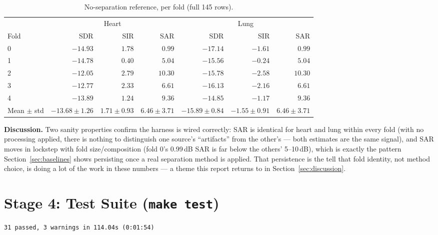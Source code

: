 \documentclass[11pt]{article}
\begin{document}
\begin{table}[H]
\centering
\caption{No-separation reference, per fold (full 145 rows).}
\small
\begin{tabular}{@{}lrrrrrr@{}}
\toprule
& \multicolumn{3}{c}{Heart} & \multicolumn{3}{c}{Lung} \\
Fold & SDR & SIR & SAR & SDR & SIR & SAR \\
\midrule
0 & $-14.93$ & $1.78$ & $0.99$  & $-17.14$ & $-1.61$ & $0.99$ \\
1 & $-14.78$ & $0.40$ & $5.04$  & $-15.56$ & $-0.24$ & $5.04$ \\
2 & $-12.05$ & $2.79$ & $10.30$ & $-15.78$ & $-2.58$ & $10.30$ \\
3 & $-12.77$ & $2.33$ & $6.61$  & $-16.13$ & $-2.16$ & $6.61$ \\
4 & $-13.89$ & $1.24$ & $9.36$  & $-14.85$ & $-1.17$ & $9.36$ \\
\midrule
Mean $\pm$ std & $-13.68\pm1.26$ & $1.71\pm0.93$ & $6.46\pm3.71$ & $-15.89\pm0.84$ & $-1.55\pm0.91$ & $6.46\pm3.71$ \\
\bottomrule
\end{tabular}
\end{table}

\textbf{Discussion.} Two sanity properties confirm the harness is wired
correctly: SAR is identical for heart and lung within every fold (with no
processing applied, there is nothing to distinguish one source's
``artifacts'' from the other's --- both estimates are the same signal), and
SAR moves in lockstep with fold size/composition (fold 0's 0.99\,dB SAR is
far below the others' 5--10\,dB), which is exactly the pattern
Section~\ref{sec:baselines} shows persisting once a real separation method
is applied. That persistence is the tell that fold identity, not method
choice, is doing a lot of the work in these numbers --- a theme this report
returns to in Section~\ref{sec:discussion}.

\section{Stage 4: Test Suite (\texttt{make test})}

\begin{verbatim}
31 passed, 3 warnings in 114.04s (0:01:54)
\end{verbatim}
\end{document}
